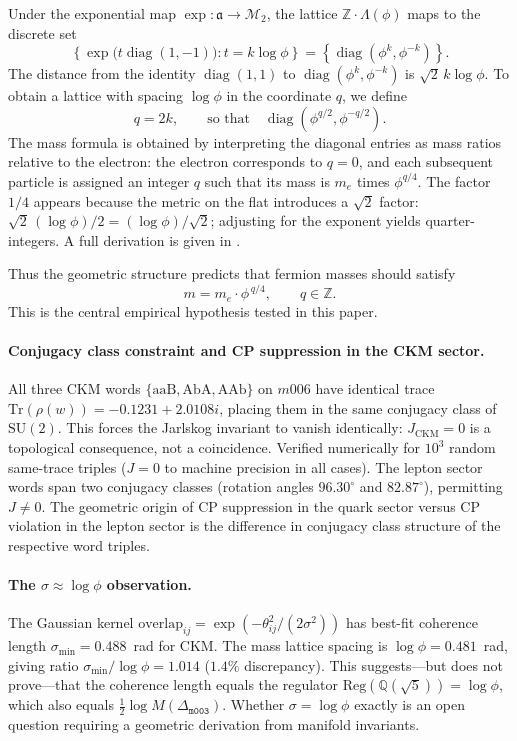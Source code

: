 \documentclass[12pt]{article}
\theoremstyle{definition}
\begin{document}
Under the exponential map $\exp:\mathfrak{a}\to\mathcal{M}_2$, the lattice $\mathbb{Z}\cdot\Lambda(\phi)$ maps to the discrete set
\[
\left\{ \exp\!\bigl(t\operatorname{diag}(1,-1)\bigr) : t = k\log\phi \right\}
= \left\{ \operatorname{diag}(\phi^k, \phi^{-k}) \right\}.
\]
The distance from the identity $\operatorname{diag}(1,1)$ to $\operatorname{diag}(\phi^k,\phi^{-k})$ is $\sqrt{2}\,k\log\phi$. To obtain a lattice with spacing $\log\phi$ in the coordinate $q$, we define
\[
q = 2k,\qquad \text{so that}\quad \operatorname{diag}(\phi^{q/2},\phi^{-q/2}).
\]
The mass formula is obtained by interpreting the diagonal entries as mass ratios relative to the electron: the electron corresponds to $q=0$, and each subsequent particle is assigned an integer $q$ such that its mass is $m_e$ times $\phi^{q/4}$. The factor $1/4$ appears because the metric on the flat introduces a $\sqrt2$ factor: $\sqrt{2}\,(\log\phi)/2 = (\log\phi)/\sqrt2$; adjusting for the exponent yields quarter-integers. A full derivation is given in \cite{Gentry:ShapeSpace}.

Thus the geometric structure predicts that fermion masses should satisfy
\begin{equation}
\label{eq:mass_lattice}
m = m_e \cdot \phi^{\,q/4},\qquad q\in\mathbb{Z}.
\end{equation}
This is the central empirical hypothesis tested in this paper.




\paragraph{Conjugacy class constraint and CP suppression in the CKM sector.}
All three CKM words $\{\mathrm{aaB},\mathrm{AbA},\mathrm{AAb}\}$ on $m006$
have identical trace $\mathrm{Tr}(\rho(w))=-0.1231+2.0108i$,
placing them in the same conjugacy class of $\mathrm{SU}(2)$.
This forces the Jarlskog invariant to vanish identically: $J_{\mathrm{CKM}}=0$
is a topological consequence, not a coincidence.
Verified numerically for $10^3$ random same-trace triples ($J=0$ to
machine precision in all cases).
The lepton sector words span two conjugacy classes
(rotation angles $96.30^\circ$ and $82.87^\circ$), permitting $J\neq0$.
The geometric origin of CP suppression in the quark sector versus
CP violation in the lepton sector is the difference in conjugacy class
structure of the respective word triples.

\paragraph{The $\sigma\approx\log\phi$ observation.}
The Gaussian kernel
$\mathrm{overlap}_{ij}=\exp(-\theta_{ij}^2/(2\sigma^2))$
has best-fit coherence length $\sigma_{\min}=0.488$~rad for CKM.
The mass lattice spacing is $\log\phi=0.481$~rad, giving ratio
$\sigma_{\min}/\log\phi=1.014$ ($1.4\%$ discrepancy).
This suggests---but does not prove---that the coherence length
equals the regulator $\mathrm{Reg}(\mathbb{Q}(\sqrt5))=\log\phi$,
which also equals $\tfrac{1}{2}\log M(\Delta_{\texttt{m003}})$.
Whether $\sigma=\log\phi$ exactly is an open question requiring
a geometric derivation from manifold invariants.
\end{document}
